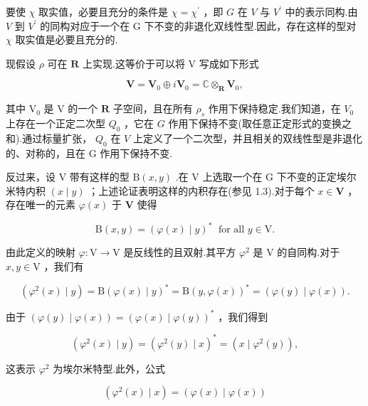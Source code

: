 \documentclass[10pt]{article}
\begin{document}
要使 \(\chi\) 取实值，必要且充分的条件是 \(\chi  = {\chi }^{\prime }\) ，即 \(G\) 在 \(V\) 与 \({V}^{\prime }\) 中的表示同构.由 \(V\) 到 \({V}^{\prime }\) 的同构对应于一个在 G 下不变的非退化双线性型.因此，存在这样的型对 \(\chi\) 取实值是必要且充分的.

现假设 \(\rho\) 可在 \(\mathbf{R}\) 上实现.这等价于可以将 \(\mathrm{V}\) 写成如下形式

\[
\mathbf{V} = {\mathbf{V}}_{0} \oplus  i{\mathbf{V}}_{0} = \mathbb{C}{ \otimes  }_{\mathbf{R}}{\mathbf{V}}_{0},
\]

其中 \({\mathrm{V}}_{0}\) 是 \(\mathrm{V}\) 的一个 \(\mathbf{R}\) 子空间，且在所有 \({\rho }_{s}\) 作用下保持稳定.我们知道，在 \({V}_{0}\) 上存在一个正定二次型 \({Q}_{0}\) ，它在 \(G\) 作用下保持不变(取任意正定形式的变换之和).通过标量扩张， \({Q}_{0}\) 在 \(V\) 上定义了一个二次型，并且相关的双线性型是非退化的、对称的，且在 G 作用下保持不变.

反过来，设 V 带有这样的型 \(\mathrm{B}\left( {x,y}\right)\) .在 V 上选取一个在 G 下不变的正定埃尔米特内积 \(\left( {x \mid  y}\right)\) ；上述论证表明这样的内积存在(参见 1.3).对于每个 \(x \in  \mathbf{V}\) ，存在唯一的元素 \(\varphi \left( x\right)\) 于 \(\mathbf{V}\) 使得

\[
\mathrm{B}\left( {x,y}\right)  = {\left( \varphi \left( x\right)  \mid  y\right) }^{ * }\;\text{ for all }y \in  \mathrm{V}.
\]

由此定义的映射 \(\varphi  : \mathrm{V} \rightarrow  \mathrm{V}\) 是反线性的且双射.其平方 \({\varphi }^{2}\) 是 \(\mathrm{V}\) 的自同构.对于 \(x,y \in  \mathrm{V}\) ，我们有

\[
\left( {{\varphi }^{2}\left( x\right)  \mid  y}\right)  = \mathrm{B}{\left( \varphi \left( x\right)  \mid  y\right) }^{ * } = \mathrm{B}{\left( y,\varphi \left( x\right) \right) }^{ * } = \left( {\varphi \left( y\right)  \mid  \varphi \left( x\right) }\right) .
\]

由于 \(\left( {\varphi \left( y\right)  \mid  \varphi \left( x\right) }\right)  = {\left( \varphi \left( x\right)  \mid  \varphi \left( y\right) \right) }^{ * }\) ，我们得到

\[
\left( {{\varphi }^{2}\left( x\right)  \mid  y}\right)  = {\left( {\varphi }^{2}\left( y\right)  \mid  x\right) }^{ * } = \left( {x \mid  {\varphi }^{2}\left( y\right) }\right) ,
\]

这表示 \({\varphi }^{2}\) 为埃尔米特型.此外，公式

\[
\left( {{\varphi }^{2}\left( x\right)  \mid  x}\right)  = \left( {\varphi \left( x\right)  \mid  \varphi \left( x\right) }\right)
\]
\end{document}
